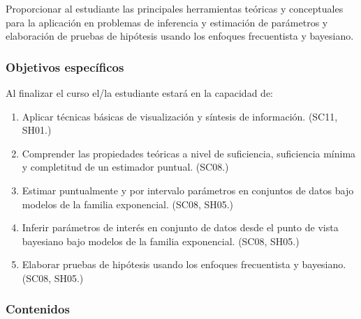 \begin{refsection}
Proporcionar al estudiante las principales herramientas teóricas y conceptuales para la aplicación en problemas de inferencia y estimación de parámetros y elaboración de pruebas de hipótesis usando los enfoques frecuentista y bayesiano.

\subsubsection*{Objetivos específicos}

Al finalizar el curso el/la estudiante estará en la capacidad de:

\begin{enumerate}
\item Aplicar técnicas básicas de visualización y síntesis de información. (SC11, SH01.)
\item Comprender las propiedades teóricas a nivel de suficiencia, suficiencia mínima y completitud de un estimador puntual. (SC08.)
\item Estimar puntualmente y por intervalo parámetros en conjuntos de datos bajo modelos de la familia exponencial. (SC08, SH05.)
\item Inferir parámetros de interés en conjunto de datos desde el punto de vista bayesiano bajo modelos de la familia exponencial. (SC08, SH05.)
\item Elaborar pruebas de hipótesis usando los enfoques frecuentista y bayesiano. (SC08, SH05.)
\end{enumerate}

\subsubsection*{Contenidos}


\end{refsection}
